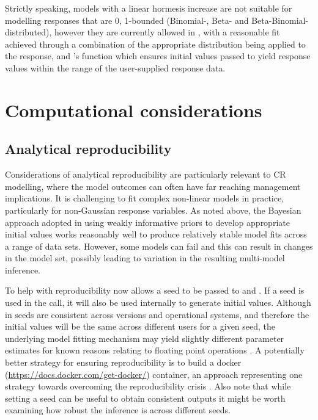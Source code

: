\documentclass[
  shortnames]{jss}
\begin{document}
Strictly speaking, models with a linear hormesis increase are not suitable for modelling responses that are 0, 1-bounded (Binomial-, Beta- and Beta-Binomial-distributed), however they are currently allowed in , with a reasonable fit achieved through a combination of the appropriate distribution being applied to the response, and 's  function which ensures initial values passed to  yield response values within the range of the user-supplied response data.

\section[Computational considerations]{Computational considerations}\label{comptime}

\hypertarget{analytical-reproducibility}{%
\subsection{Analytical reproducibility}\label{analytical-reproducibility}}

Considerations of analytical reproducibility are particularly relevant to CR modelling, where the model outcomes can often have far reaching management implications. It is challenging to fit complex non-linear models in practice, particularly for non-Gaussian response variables. As noted above, the Bayesian approach adopted in  using weakly informative priors to develop appropriate initial values works reasonably well to produce relatively stable model fits across a range of data sets. However, some models can fail and this can result in changes in the model set, possibly leading to variation in the resulting multi-model inference.

To help with reproducibility  now allows a seed to be passed to  and . If a seed is used in the  call, it will also be used internally to generate initial values. Although in  seeds are consistent across versions and operational systems, and therefore the initial values will be the same across different users for a given seed, the underlying  model fitting mechanism may yield slightly different parameter estimates for known reasons relating to floating point operations \citep[see chapter 20 in][]{stan2021}. A potentially better strategy for ensuring reproducibility is to build a docker (\url{https://docs.docker.com/get-docker/}) container, an approach representing one strategy towards overcoming the reproducibility crisis \citep{Baker2016}. Also note that while setting a seed can be useful to obtain consistent outputs it might be worth examining how robust the inference is across different seeds.
\end{document}
